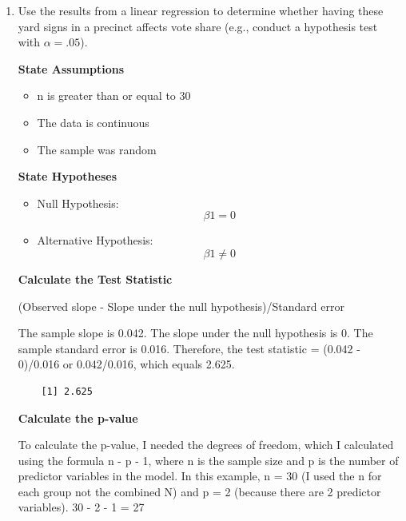 \documentclass[12pt,letterpaper]{article}
\begin{document}
\vspace{.5cm}
\begin{enumerate}
	\item [(a)] Use the results from a linear regression to determine whether having these yard signs in a precinct affects vote share (e.g., conduct a hypothesis test with $\alpha = .05$).
	\vspace{.5cm}
	
	\noindent \textbf{State Assumptions}
	
	\begin{itemize}
	\item n is greater than or equal to 30
	\item The data is continuous
	\item The sample was random
	\end{itemize}
	
	\newpage
	
	\noindent \textbf{State Hypotheses}
	\begin{itemize}
	\item Null Hypothesis: $$\beta1 = 0$$
	\item Alternative Hypothesis: $$\beta1 \neq 0$$
	\end{itemize}
	
	\noindent \textbf{Calculate the Test Statistic}
	
	\noindent (Observed slope - Slope under the null hypothesis)/Standard error
	
	\noindent The sample slope is 0.042. The slope under the null hypothesis is 0. The sample standard error is 0.016. Therefore, the test statistic = (0.042 - 0)/0.016 or 0.042/0.016, which equals 2.625.
	
	
	
	\begin{verbatim}
	[1] 2.625
	\end{verbatim}
	
	\noindent \textbf{Calculate the p-value}
	
	\noindent To calculate the p-value, I needed the degrees of freedom, which I calculated using the formula n - p - 1, where n is the sample size and p is the number of predictor variables in the model. In this example, n = 30 (I used the n for each group not the combined N) and p = 2 (because there are 2 predictor variables). 30 - 2 - 1 = 27
	
	
	

\end{enumerate}
\end{document}
